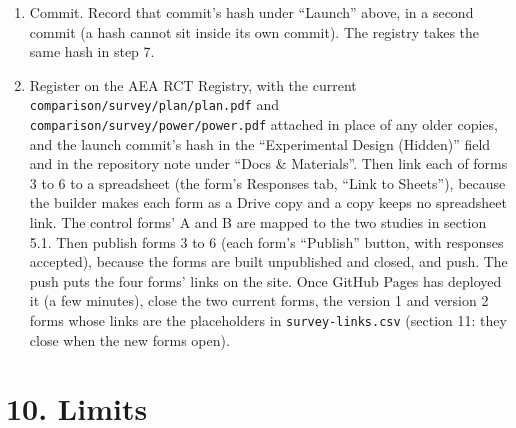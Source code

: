 \begin{enumerate}
\item
  Commit. Record that commit's hash under ``Launch'' above, in a second commit (a hash cannot sit
  inside its own commit). The registry takes the same hash in step 7.
\item
  Register on the AEA RCT Registry, with the current \texttt{comparison/survey/plan/plan.pdf} and
  \texttt{comparison/survey/power/power.pdf} attached in place of any older copies, and the launch
  commit's hash in the ``Experimental Design (Hidden)'' field and in the repository note under
  ``Docs \& Materials''. Then link each of forms 3 to 6 to a spreadsheet (the form's Responses tab,
  ``Link to Sheets''), because the builder makes each form as a Drive copy and a copy keeps no
  spreadsheet link. The control forms' A and B are mapped to the two studies in section 5.1. Then
  publish forms 3 to 6 (each form's ``Publish'' button, with responses accepted), because the forms
  are built unpublished and closed, and push. The push puts the four forms' links on the
  site. Once GitHub Pages has deployed it (a few minutes), close the two current forms, the
  version 1 and version 2 forms whose links are the placeholders in \texttt{survey-links.csv} (section
  11: they close when the new forms open).
\end{enumerate}

\section{10. Limits}\label{limits}

